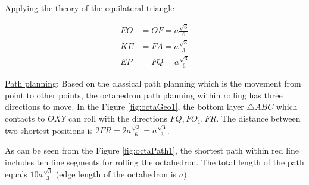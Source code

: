 \noindent Applying the theory of the equilateral triangle

\begin{equation*} 
\label{octa:eq4}
\begin{split}
EO & = OF = a\frac{\sqrt{6}}{6}\\
KE & = FA = a\frac{\sqrt{3}}{3}\\
EP & = FQ = a\frac{\sqrt{3}}{6}
\end{split}
\end{equation*}

\noindent\uline{Path planning}:
Based on the classical path planning which is the movement from point to other points, the octahedron path planning within rolling has three directions to move. In the Figure \ref{fig:octaGeo1}, the bottom layer $\triangle ABC$ which contacts to $OXY$ can roll with the directions $FQ, FO_1, FR$. The distance between two shortest positions is $2FR= 2a\frac{\sqrt{3}}{6}=a\frac{\sqrt{3}}{3}$. 

\noindent As can be seen from the Figure \ref{fig:octaPath1}, the shortest path within red line includes ten line segments for rolling the octahedron. The total length of the path equals $10a\frac{\sqrt{3}}{3}$ (edge length of the octahedron is $a$).

